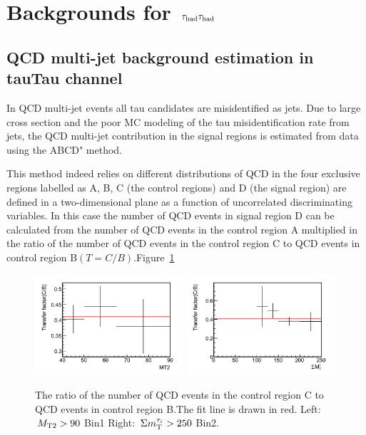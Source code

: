 \section{\texorpdfstring{Backgrounds for $\,\tau_{\rm had}\tau_{\rm had}$}{Backgrounds for tauTau}}
\label{sect:bkg}


\subsection{QCD multi-jet background estimation in tauTau channel}



In QCD multi-jet events all tau candidates are misidentified as jets. Due to large cross
section and
the poor MC modeling of the tau misidentification rate from jets, the QCD multi-jet contribution in the signal regions is estimated from data using the ABCD" method.

This method indeed relies on different distributions of QCD
in the four exclusive regions labelled as A, B, C (the control regions) and D (the signal region) are defined in a two-dimensional plane as a function of uncorrelated discriminating variables.
In this case the number of QCD events in signal region D can be calculated from the number of QCD events in the control region A multiplied in the ratio of the number of QCD events in the control region C to QCD events in control region B$(T=C/B)$.Figure~\ref{fig:1QCDbg} 

\begin{figure}[htbp]
\centering
\includegraphics[width=0.49\textwidth]{QCDbginTauTau/Bin1_transferfactor.png}
\includegraphics[width=0.49\textwidth]{QCDbginTauTau/Bin2_transferfactor.png} \\
\caption{The ratio of the number of QCD events in the control region C to QCD events in control region B.The
fit line  is drawn in red.
 Left:  $\,{M_{\rm T2}}>90$ Bin1   Right:  $\,\Sigma m_{\rm T}^{\tau_i} >250$ Bin2.}
\label{fig:1QCDbg}
\end{figure}

